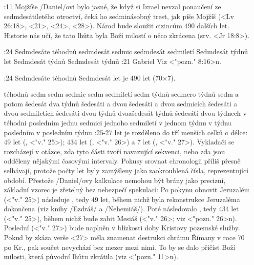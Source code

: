 :11 {Mojžíše} \x/Daniel/ovi bylo jasné, že když si Izrael nevzal ponaučení ze sedmdesátiletého otroctví, čeká ho sedminásobný trest, jak píše Mojžíš (<Lv 26:18>, <21>, <24>, <28>). Národ bude sloužit cizincům 490 dalších let. Historie nás učí, že tato lhůta byla Boží milostí o něco zkrácena (srv. <Jr 18:8>).
\dopsat


:24 {Sedmdesáte téhodnů} {sedmdesát sedmic} {sedmdesát sedmiletí} {Sedmdesát týdnů let} {Sedmdesát týdnů} {Sedmdesát týdnů}
:21 {Gabriel} Viz <"pozn." 8:16>n. 

:24 {Sedmdesáte téhodnů} Sedmdesát  let je 490 let (70$\times$7).

\vdef %
    {téhodnů sedm}   %
    {sedm sedmic}   %
    {sedm sedmiletí}   %
    {sedm týdnů}   %
    {sedmero týdnů}   %
    {sedm a potom šedesát dva týdnů}   %
\vdef %
    {šedesáti a dvou}   %
    {šedesáti a dvou sedmicích}   %
    {šedesáti a dvou sedmiletích}   %
    {šedesáti dvou týdnů}   %
    {dvaašedesát týdnů}   %
    {šedesáti dvou týdnech}   %
\vdef %
    {v téhodni posledním}   %
    {jednu sedmici}   %
    {jednoho sedmiletí}   %
    {v jednom týdnu}   %
    {v týdnu posledním}   %
    {v posledním týdnu}   %
:25-27 {}  let je rozděleno do tří menších celků o délce: 49 let (, <"v." 25>); 434 let (, <"v." 26>) a 7 let (, <"v." 27>).
Vykladači se rozcházejí v otázce, zda tyto části tvoří navazující sekvenci, nebo zda jsou odděleny nějakými časovými intervaly. Pokusy srovnat chronologii příliš přesně selhávají, protože počty let byly zamýšleny jako zaokrouhlená čísla, reprezentující období. Přestože \x/Daniel/ovy kalkulace nemohou být brány jako precizní, základní vzorec je zřetelný bez nebezpečí spekulací:
Po pokynu obnovit Jeruzalém (<"v." 25>) následuje , tedy 49 let, během nichž byla rekonstrukce Jeruzaléma dokončena (viz knihy \x/Ezdráš/ a \x/Nehemiáš/). Poté následovalo , tedy 434 let (<"v." 25>), během nichž bude zabit Mesiáš (<"v." 26>; viz <"pozn." 26>n).  Poslední  (<"v." 27>) bude naplněn v blízkosti doby Kristovy pozemské služby. Pokud by zkáza verše <27> měla znamenat destrukci chrámu Římany v roce 70 po Kr., pak součet  nevychází bez mezer mezi nimi. To by se dalo přičíst Boží milosti, která původní lhůtu zkrátila (viz <"pozn." 11>n).

